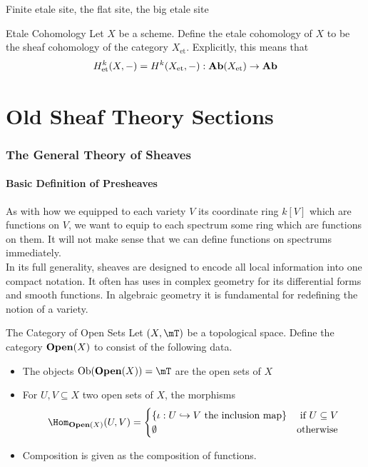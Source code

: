 \documentclass[a4paper]{article}
\begin{document}
Finite etale site, the flat site, the big etale site

\begin{defn}{Etale Cohomology}{} Let $X$ be a scheme. Define the etale cohomology of $X$ to be the sheaf cohomology of the category $X_\text{et}$. Explicitly, this means that $$H_\text{et}^k(X,-)=H^k(X_\text{et},-):\bold{Ab}(X_\text{et})\to\bold{Ab}$$
\end{defn}

\pagebreak
\part{Old Sheaf Theory Sections}
\section{The General Theory of Sheaves}
\subsection{Basic Definition of Presheaves}
As with how we equipped to each variety $V$ its coordinate ring $k[V]$ which are functions on $V$, we want to equip to each spectrum some ring which are functions on them. It will not make sense that we can define functions on spectrums immediately. \\

In its full generality, sheaves are designed to encode all local information into one compact notation. It often has uses in complex geometry for its differential forms and smooth functions. In algebraic geometry it is fundamental for redefining the notion of a variety. 

\begin{defn}{The Category of Open Sets}{} Let $(X,\mT)$ be a topological space. Define the category $\bold{Open}(X)$ to consist of the following data. 
\begin{itemize}
\item The objects $\text{Ob}(\bold{Open}(X))=\mT$ are the open sets of $X$
\item For $U,V\subseteq X$ two open sets of $X$, the morphisms $$\Hom_{\bold{Open}(X)}(U,V)=\begin{cases}
\{\iota:U\hookrightarrow V\text{ the inclusion map}\} & \text{ if } U\subseteq V\\
\emptyset & \text{otherwise}
\end{cases}$$
\item Composition is given as the composition of functions. 
\end{itemize}
\end{defn}
\end{document}
